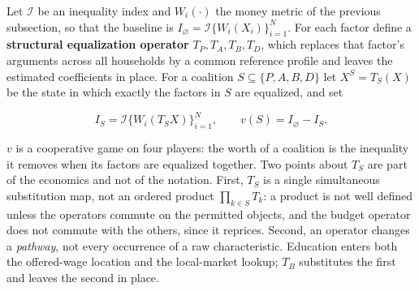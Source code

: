 Let \(\mathcal I\) be an inequality index and \(W_i(\cdot)\) the money metric of the previous subsection, so that the baseline is \(I_\varnothing=\mathcal I\{W_i(X_i)\}_{i=1}^N\). For each factor define a \textbf{structural equalization operator} \(T_P,T_A,T_B,T_D\), which replaces that factor's arguments across all households by a common reference profile and leaves the estimated coefficients in place. For a coalition \(S\subseteq\{P,A,B,D\}\) let \(X^S=T_S(X)\) be the state in which exactly the factors in \(S\) are equalized, and set

\[
I_S=\mathcal I\{W_i(T_S X)\}_{i=1}^{N},
\qquad
v(S)=I_\varnothing-I_S .
\]

\(v\) is a cooperative game on four players: the worth of a coalition is the inequality it removes when its factors are equalized together. Two points about \(T_S\) are part of the economics and not of the notation. First, \(T_S\) is a single simultaneous substitution map, not an ordered product \(\prod_{k\in S}T_k\): a product is not well defined unless the operators commute on the permitted objects, and the budget operator does not commute with the others, since it reprices. Second, an operator changes a \emph{pathway}, not every occurrence of a raw characteristic. Education enters both the offered-wage location and the local-market lookup; \(T_B\) substitutes the first and leaves the second in place.


